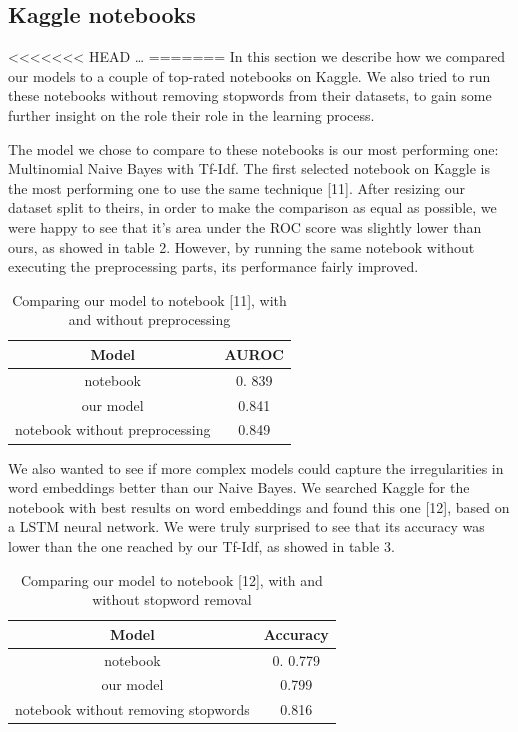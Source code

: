 \subsection*{Kaggle notebooks}

<<<<<<< HEAD
\dots
=======
In this section we describe how we compared our models to a couple of top-rated notebooks on Kaggle.  We also tried to run these notebooks without removing stopwords from their datasets, to gain some further insight on the role their role in the learning process. 

The model we chose to compare to these notebooks is our most performing one: Multinomial Naive Bayes with Tf-Idf.  The first selected notebook on Kaggle is the most performing one to use the same technique [11].  After resizing our dataset split to theirs, in order to make the comparison as equal as possible,  we were happy to see that it's area under the ROC score was slightly lower than ours,  as showed in table 2.  However, by running the same notebook without executing the preprocessing parts, its performance fairly improved.

\begin{table}[h!t]
    \centering
    \caption{Comparing our model to notebook [11],  with and without preprocessing}
    \label{tab:versus_metrics}
    \begin{tabular}{c|c}
        \hline
        Model & AUROC \\
        \hline 
        notebook & 0. 839 \\ 
        our model & 0.841 \\ 
        notebook without preprocessing & 0.849 \\ 
        \hline
    \end{tabular}
\end{table}

We also wanted to see if more complex models could capture the irregularities in word embeddings better than our Naive Bayes.  We searched Kaggle for the notebook with best results on word embeddings and found this one [12],  based on a LSTM neural network.  We were truly surprised to see that its accuracy was lower than the one reached by our Tf-Idf,  as showed in table 3. 

\begin{table}[h!t]
    \centering
    \caption{Comparing our model to notebook [12],  with and without stopword removal}
    \label{tab:versus_metrics}
    \begin{tabular}{c|c}
        \hline
        Model & Accuracy\\
        \hline 
        notebook & 0. 0.779 \\ 
        our model & 0.799 \\ 
        notebook without removing stopwords & 0.816 \\ 
        \hline
    \end{tabular}
\end{table}

